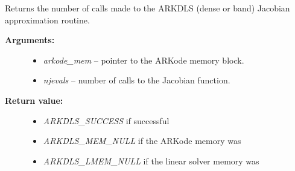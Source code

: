 \documentclass[letterpaper,10pt,english]{sphinxmanual}
\begin{document}
\begin{fulllineitems}
\label{c_interface/User_callable:ARKDlsGetNumJacEvals}
Returns the number of calls made to the ARKDLS
(dense or band) Jacobian approximation routine.
\begin{description}
\item[{\textbf{Arguments:}}] \leavevmode\begin{itemize}
\item {} 
\emph{arkode\_mem} -- pointer to the ARKode memory block.

\item {} 
\emph{njevals} -- number of calls to the Jacobian function.

\end{itemize}

\item[{\textbf{Return value:}}] \leavevmode\begin{itemize}
\item {} 
\emph{ARKDLS\_SUCCESS} if successful

\item {} 
\emph{ARKDLS\_MEM\_NULL} if the ARKode memory was 

\item {} 
\emph{ARKDLS\_LMEM\_NULL} if the linear solver memory was 

\end{itemize}

\end{description}

\end{fulllineitems}

\end{document}
